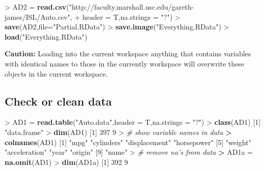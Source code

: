 \documentclass[]{article}
\newenvironment{Shaded}{\begin{snugshade}}{\end{snugshade}}
\newcommand{\KeywordTok}[1]{\textcolor[rgb]{0.13,0.29,0.53}{\textbf{{#1}}}}
\newcommand{\DataTypeTok}[1]{\textcolor[rgb]{0.13,0.29,0.53}{{#1}}}
\newcommand{\DecValTok}[1]{\textcolor[rgb]{0.00,0.00,0.81}{{#1}}}
\newcommand{\StringTok}[1]{\textcolor[rgb]{0.31,0.60,0.02}{{#1}}}
\newcommand{\CommentTok}[1]{\textcolor[rgb]{0.56,0.35,0.01}{\textit{{#1}}}}
\newcommand{\ErrorTok}[1]{\textcolor[rgb]{0.64,0.00,0.00}{\textbf{{#1}}}}
\newcommand{\NormalTok}[1]{{#1}}
\begin{document}
\begin{Shaded}
\begin{Highlighting}[]
\NormalTok{>}\StringTok{ }\NormalTok{AD2 =}\StringTok{ }\KeywordTok{read.csv}\NormalTok{(}\StringTok{"http://faculty.marshall.usc.edu/gareth-james/ISL/Auto.csv"}\NormalTok{,}
\NormalTok{+}\StringTok{                  }\DataTypeTok{header =} \NormalTok{T,}\DataTypeTok{na.strings =} \StringTok{"?"}\NormalTok{)}
\NormalTok{>}\StringTok{ }\KeywordTok{save}\NormalTok{(AD2,}\DataTypeTok{file=}\StringTok{"Partial.RData"}\NormalTok{)}
\NormalTok{>}\StringTok{ }\KeywordTok{save.image}\NormalTok{(}\StringTok{"Everything.RData"}\NormalTok{)}
\NormalTok{>}\StringTok{ }\KeywordTok{load}\NormalTok{(}\StringTok{"Everything.RData"}\NormalTok{)}
\end{Highlighting}
\end{Shaded}

\textbf{Caution:} Loading into the current workspace anything that
contains variables with identical names to those in the currently
workspace will overwrite these objects in the current workspace.

\subsection{Check or clean data}\label{check-or-clean-data}

\begin{Shaded}
\begin{Highlighting}[]
\NormalTok{>}\StringTok{ }\NormalTok{AD1 =}\StringTok{ }\KeywordTok{read.table}\NormalTok{(}\StringTok{"Auto.data"}\NormalTok{,}\DataTypeTok{header =} \NormalTok{T,}\DataTypeTok{na.strings =} \StringTok{"?"}\NormalTok{)}
\NormalTok{>}\StringTok{ }\KeywordTok{class}\NormalTok{(AD1)}
\NormalTok{[}\DecValTok{1}\NormalTok{] }\StringTok{"data.frame"}
\NormalTok{>}\StringTok{ }\KeywordTok{dim}\NormalTok{(AD1)}
\NormalTok{[}\DecValTok{1}\NormalTok{] }\DecValTok{397}   \DecValTok{9}
\NormalTok{>}\StringTok{ }\CommentTok{# show variable names in data}
\ErrorTok{>}\StringTok{ }\KeywordTok{colnames}\NormalTok{(AD1)}
\NormalTok{[}\DecValTok{1}\NormalTok{] }\StringTok{"mpg"}          \StringTok{"cylinders"}    \StringTok{"displacement"} \StringTok{"horsepower"}  
\NormalTok{[}\DecValTok{5}\NormalTok{] }\StringTok{"weight"}       \StringTok{"acceleration"} \StringTok{"year"}         \StringTok{"origin"}      
\NormalTok{[}\DecValTok{9}\NormalTok{] }\StringTok{"name"}        
\NormalTok{>}\StringTok{ }\CommentTok{# remove na's from data}
\ErrorTok{>}\StringTok{ }\NormalTok{AD1a =}\StringTok{ }\KeywordTok{na.omit}\NormalTok{(AD1)}
\NormalTok{>}\StringTok{ }\KeywordTok{dim}\NormalTok{(AD1a)}
\NormalTok{[}\DecValTok{1}\NormalTok{] }\DecValTok{392}   \DecValTok{9}
\end{Highlighting}
\end{Shaded}
\end{document}
